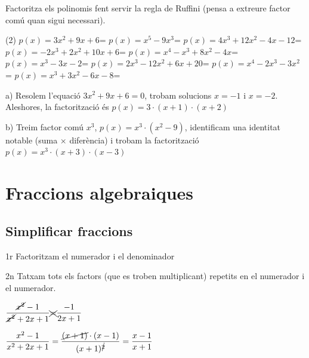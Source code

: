 \begin{mylist}


\exer[1] Factoritza els polinomis fent servir la regla de Ruffini (pensa a extreure factor com\'{u}       quan sigui necessari).
\begin{tasks}(2)
	\task  $p(x)=3x^{2} +9x+6$=                  
	\task  $p(x)=x^{5} -9x^{3} $=
	\task  $p(x)=4x^{3} +12x^{2} -4x-12$=     
	\task  $p(x)=-2x^{3} +2x^{2} +10x+6$=                        
	\task  $p(x)=x^{4} -x^{3} +8x^{2} -4x$=               
	\task  $p(x)=x^{3} -3x-2$=
	\task  $p(x)=2x^{3} -12x^{2} +6x+20$=       
	\task  $p(x)=x^{4} -2x^{3} -3x^{2} $=      
	\task  $p(x)=x^{3} +3x^{2} -6x-8$=
\end{tasks} 

\end{mylist}
\begin{example}
	 	a) Resolem l'equació $3x^{2} +9x+6=0$, trobam solucions $x=-1$ i $x=-2$. Aleshores, la factorització és $p(x)=3\cdot(x+1)\cdot(x+2)$
	
	b) Treim factor comú $x^3$, $p(x)=x^3 \cdot(x^{2} -9)$, identificam una identitat notable (suma $\times$ diferència) i trobam la factorització $p(x)=x^3 \cdot(x+3)\cdot (x-3)$
\end{example}


\section{Fraccions algebraiques}
\vspace{-0.25cm}
\subsection{Simplificar fraccions}
\vspace{-0.25cm}
\begin{theorybox}
	
		
	1r Factoritzam el numerador i el denominador
	
	2n Tatxam tots els factors (que es troben multiplicant) repetits en el numerador i el numerador.	
\end{theorybox}
\begin{warningbox}
	\begin{minipage}{0.65\textwidth}
	 	\malament
		$\dfrac{\cancel{x^2}-1}{\cancel{x^2}+2x+1} \xcancel{=} \dfrac{-1}{2x+1}$
		
		
		
		\be
		$\dfrac{x^2-1}{x^2+2x+1} = \dfrac{\cancel{(x+1)}\cdot(x-1)}{(x+1)^{\cancel{2}}}=
		\dfrac{x-1}{x+1}$	
		
		
	\end{minipage}
	\begin{minipage}{0.25\textwidth}
		\centering
	\end{minipage} 
\end{warningbox}

